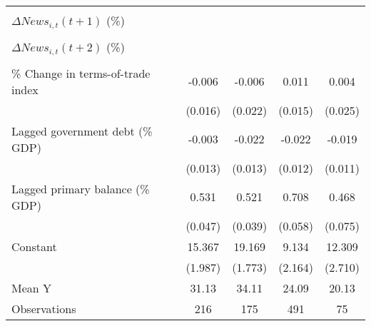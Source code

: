 {\begin{tabular}{l*{4}{c}}
                    &                     &                     &                     &                     \\
\addlinespace
$ \Delta News_{i,t}(t+1)$ (\%)&                     &                     &                     &                     \\
                    &                     &                     &                     &                     \\
\addlinespace
$ \Delta News_{i,t}(t+2)$ (\%)&                     &                     &                     &                     \\
                    &                     &                     &                     &                     \\
\addlinespace
\% Change in terms-of-trade index&      -0.006         &      -0.006         &       0.011         &       0.004         \\
                    &     (0.016)         &     (0.022)         &     (0.015)         &     (0.025)         \\
\addlinespace
Lagged government debt (\% GDP)&      -0.003         &      -0.022         &      -0.022\sym{*}  &      -0.019         \\
                    &     (0.013)         &     (0.013)         &     (0.012)         &     (0.011)         \\
\addlinespace
Lagged primary balance (\% GDP)&       0.531\sym{***}&       0.521\sym{***}&       0.708\sym{***}&       0.468\sym{***}\\
                    &     (0.047)         &     (0.039)         &     (0.058)         &     (0.075)         \\
\addlinespace
Constant            &      15.367\sym{***}&      19.169\sym{***}&       9.134\sym{***}&      12.309\sym{***}\\
                    &     (1.987)         &     (1.773)         &     (2.164)         &     (2.710)         \\
\midrule
Mean Y              &       31.13         &       34.11         &       24.09         &       20.13         \\
Observations        &         216         &         175         &         491         &          75         \\
\bottomrule
\end{tabular}
}
